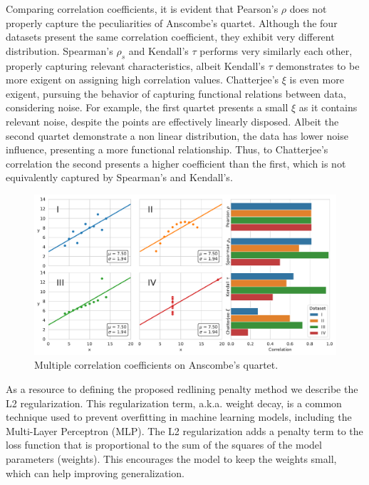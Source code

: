 Comparing correlation coefficients, it is evident that Pearson's $\rho$ does not properly capture the peculiarities of Anscombe's quartet. Although the four datasets present the same correlation coefficient, they exhibit very different distribution. Spearman's $\rho_s$ and Kendall's $\tau$ performs very similarly each other, properly capturing relevant characteristics, albeit Kendall's $\tau$ demonstrates to be more exigent on assigning high correlation values. Chatterjee's $\xi$ is even more exigent, pursuing the behavior of capturing functional relations between data, considering noise. For example, the first quartet presents a small $\xi$ as it contains relevant noise, despite the points are effectively linearly disposed. Albeit the second quartet demonstrate a non linear distribution, the data has lower noise influence, presenting a more functional relationship. Thus, to Chatterjee's correlation the second presents a higher coefficient than the first, which is not equivalently captured by Spearman's and Kendall's. 
\begin{figure}[!ht]
\centering
\caption{Multiple correlation coefficients on Anscombe's quartet.}\label{fig:anscombe}
    \includegraphics[width=1\linewidth]{images/anscombe_quartet.pdf}
\end{figure}



As a resource to defining the proposed redlining penalty method we describe the L2 regularization. This regularization term, a.k.a. weight decay, is a common technique used to prevent overfitting in machine learning models, including the Multi-Layer Perceptron (MLP). The L2 regularization adds a penalty term to the loss function that is proportional to the sum of the squares of the model parameters (weights). This encourages the model to keep the weights small, which can help improving generalization.

